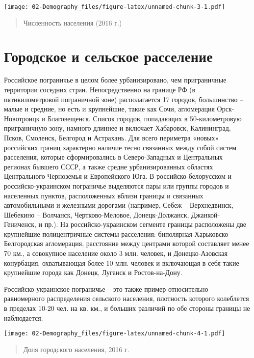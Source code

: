 \documentclass[]{book}
\begin{document}
\texttt{[image: 02-Demography\_files/figure-latex/unnamed-chunk-3-1.pdf]}

\begin{quote}
Численность населения (2016 г.)
\end{quote}

\section{Городское и сельское расселение}\label{demo-urban}

Российское пограничье в целом более урбанизировано, чем приграничные
территории соседних стран. Непосредственно на границе РФ (в
пятикилометровой пограничной зоне) располагается 17 городов, большинство
-- малые и средние, но есть и крупнейшие, такие как Сочи, агломерация
Орск-Новотроицк и Благовещенск. Список городов, попадающих в
50-километровую приграничную зону, намного длиннее и включает Хабаровск,
Калининград, Псков, Смоленск, Белгород и Астрахань. Для всего периметра
«новых» российских границ характерно наличие тесно связанных между собой
систем расселения, которые сформировались в Северо-Западных и
Центральных регионах бывшего СССР, а также средне урбанизированных
областях Центрального Черноземья и Европейского Юга. В
российско-белорусском и российско-украинском пограничье выделяются пары
или группы городов и населенных пунктов, расположенных вблизи границы и
связанных автомобильными и железными дорогами (например, Себеж --
Верхнедвинск, Шебекино -- Волчанск, Чертково-Меловое, Донецк-Должанск,
Джанкой-Гениченск, и пр.). На российско-украинском сегменте границы
расположены две крупнейшие полицентричные системы расселения: биполярная
Харьковско-Белгородская агломерация, расстояние между центрами которой
составляет менее 70 км., а совокупное население около 3 млн. человек, и
Донецко-Азовская конурбация, охватывающая более 10 млн. человек и
включающая в себя такие крупнейшие города как Донецк, Луганск и
Ростов-на-Дону.

Российско-украинское пограничье -- это также пример относительно
равномерного распределения сельского населения, плотность которого
колеблется в пределах 10-20 чел. на кв. км., и больших различий по обе
стороны границы не наблюдается.

\texttt{[image: 02-Demography\_files/figure-latex/unnamed-chunk-4-1.pdf]}

\begin{quote}
Доля городского населения, 2016 г.
\end{quote}
\end{document}
